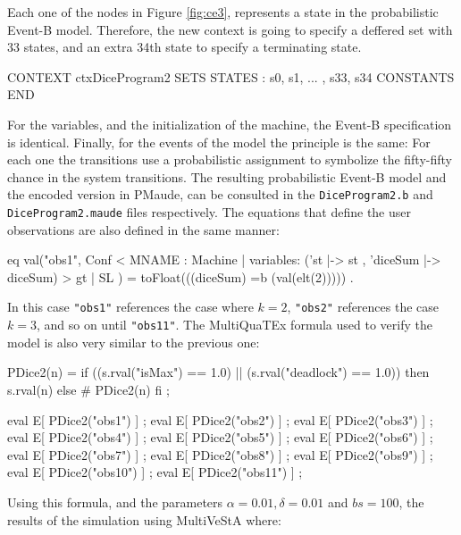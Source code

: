 Each one of the nodes in Figure \ref{fig:ce3}, represents a state in the probabilistic Event-B model. Therefore, the new context is going to specify a deffered set with 33 states, and an extra 34th state to specify a terminating state.
\begin{maude}

CONTEXT ctxDiceProgram2
SETS 
    STATES : { s0, s1, ... , s33, s34 }
CONSTANTS 
END
\end{maude}
For the variables, and the initialization of the machine, the Event-B specification is identical. Finally, for the events of the model the principle is the same: For each one the transitions use a probabilistic assignment to symbolize the fifty-fifty chance in the system transitions. The resulting probabilistic Event-B model and the encoded version in PMaude, can be consulted in the \texttt{DiceProgram2.b} and \texttt{DiceProgram2.maude} files respectively. The equations that define the user observations are also defined in the same manner:
\begin{maude}

eq val("obs1", {Conf < MNAME : Machine | 
                     variables: ('st |-> st , 'diceSum |-> diceSum) >} 
                     {gt | SL}  ) = toFloat(((diceSum) =b (val(elt(2))))) .
\end{maude}
In this case \texttt{"obs1"} references the case where $k = 2$, \texttt{"obs2"} references the case $k = 3$, and so on until \texttt{"obs11"}. The MultiQuaTEx formula used to verify the model is also very similar to the previous one:
\begin{maude2}

PDice2(n) = if ((s.rval("isMax") == 1.0) || (s.rval("deadlock") == 1.0)) 
            then s.rval(n) else # PDice2(n) fi ;

eval E[ PDice2("obs1") ] ;
eval E[ PDice2("obs2") ] ;
eval E[ PDice2("obs3") ] ;
eval E[ PDice2("obs4") ] ;
eval E[ PDice2("obs5") ] ;
eval E[ PDice2("obs6") ] ;
eval E[ PDice2("obs7") ] ;
eval E[ PDice2("obs8") ] ;
eval E[ PDice2("obs9") ] ;
eval E[ PDice2("obs10") ] ;
eval E[ PDice2("obs11") ] ;
\end{maude2}
Using this formula, and the parameters $\alpha = 0.01, \delta = 0.01$ and $bs = 100$, the results of the simulation using MultiVeStA where:

